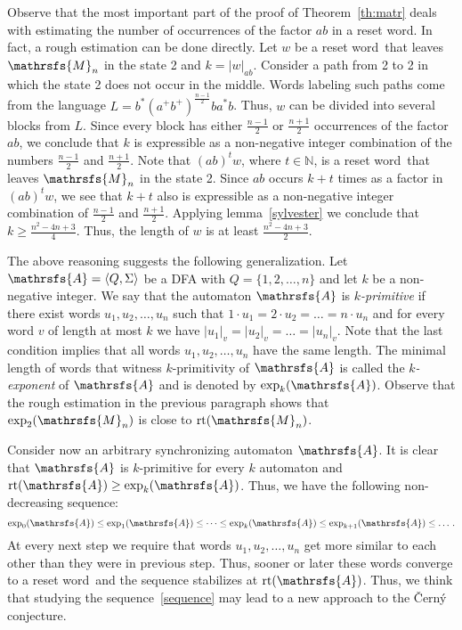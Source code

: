 \documentclass[12pt,twoside]{article}
\newcommand{\sw}{reset word}
\DeclareMathOperator{\rt}{rt}
\begin{document}
Observe that the most important part of the proof of Theorem~\ref{th:matr}
deals with estimating the number of occurrences of the factor $ab$ in a reset
word. In fact, a rough estimation can be done directly. Let $w$ be a \sw\ that
leaves $\mathrsfs{M}_n$ in the state 2 and $k=|w|_{ab}$. Consider a path from 2
to 2 in which the state 2 does not occur in the middle. Words labeling such
paths come from the language $L=b^*(a^+b^+)^{\frac{n - 1}{2}}ba^*b$. Thus, $w$
can be divided into several blocks from $L$. Since every block has either
$\frac{n - 1}{2}$ or $\frac{n+1}{2}$ occurrences of the factor $ab$, we
conclude that $k$ is expressible as a non-negative integer combination of the
numbers $\frac{n-1}{2}$ and $\frac{n+1}{2}$. Note that $(ab)^tw$, where $t \in
\mathbb{N}$, is a \sw\ that leaves $\mathrsfs{M}_n$ in the state 2. Since $ab$
occurs $k + t$ times as a factor in $(ab)^tw$, we see that $k + t$ also is
expressible as a non-negative integer combination of $\frac{n-1}{2}$ and
$\frac{n+1}{2}$. Applying lemma~\ref{sylvester} we conclude that $k \geq
\frac{n^2 - 4n + 3}{4}$. Thus, the length of $w$ is at least $\frac{n^2 - 4n +
3}{2}$.

The above reasoning  suggests the following generalization. Let $\mathrsfs{A} =
\langle Q, \Sigma \rangle$ be a DFA with $Q=\{1,2,\dots,n\}$ and let $k$ be a
non-negative integer. We say that the automaton $\mathrsfs{A}$ is
\emph{$k$-primitive} if there exist words $u_1,u_2,\dots,u_n$ such that $1\cdot
u_1=2\cdot u_2=\dots=n\cdot u_n$ and for every word $v$ of length at most $k$
we have $|u_1|_v = |u_2|_v = \ldots = |u_n|_v$. Note that the last condition
implies that all words $u_1,u_2,\dots,u_n$ have the same length. The minimal
length of words that witness $k$-primitivity of  $\mathrsfs{A}$ is called the
\emph{$k$-exponent} of $\mathrsfs{A}$ and is denoted by $\exp_k(\mathrsfs{A})$.
Observe that the rough estimation in the previous paragraph shows that
$\exp_2(\mathrsfs{M}_n)$ is close to $\rt(\mathrsfs{M}_n)$.

Consider now an arbitrary synchronizing automaton $\mathrsfs{A}$. It is clear
that $\mathrsfs{A}$ is $k$-primitive for every $k$ automaton  and
$\rt(\mathrsfs{A}) \geq \exp_k(\mathrsfs{A})$. Thus, we have the following
non-decreasing sequence:
\begin{equation}
\label{sequence}
\exp_0(\mathrsfs{A}) \leq \exp_1(\mathrsfs{A}) \leq \dots \leq
\exp_k(\mathrsfs{A}) \leq \exp_{k + 1}(\mathrsfs{A}) \leq \dotsc.
\end{equation}
At every next step we require that words $u_1,u_2,\dots,u_n$ get more similar
to each other than they were in previous step. Thus, sooner or later these
words converge to a \sw\ and the sequence stabilizes at $\rt(\mathrsfs{A})$.
Thus, we think that studying the sequence~\eqref{sequence} may lead to a new
approach to the \v{C}ern\'{y} conjecture.
\end{document}
